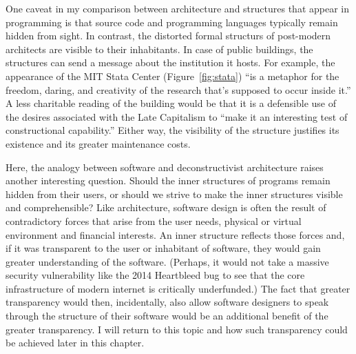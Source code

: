 One caveat in my comparison between architecture and structures that appear in programming is
that source code and programming languages typically remain hidden from sight. In contrast, the
distorted formal structurs of post-modern architects are visible to their inhabitants. In case of
public buildings, the structures can send a message about the institution it hosts. For example,
the appearance of the MIT Stata Center (Figure~\ref{fig:stata}) ``is a metaphor for the freedom,
daring, and creativity of the research that's supposed to occur inside it.''
A less charitable reading of the building would be that it is a defensible use of the
desires associated with the Late Capitalism to ``make it an interesting test of constructional
capability.'' Either way, the
visibility of the structure justifies its existence and its greater maintenance costs.

Here, the analogy between software and deconstructivist architecture raises another interesting
question. Should the inner structures of programs remain hidden from their users, or should
we strive to make the inner structures visible and comprehensible?
Like architecture, software design is often the result of contradictory forces that
arise from the user needs, physical or virtual environment and financial interests.
An inner structure reflects those forces and, if it was transparent to the user or inhabitant
of software, they would gain greater understanding of the software. (Perhaps, it would not
take a massive security vulnerability like the 2014 Heartbleed bug to see that the core
infrastructure of modern internet is critically underfunded.)
The fact that greater transparency would then, incidentally, also allow software designers to
speak through the structure of their software would be an additional benefit of the greater
transparency. I will return to this topic and how such transparency could be achieved
later in this chapter.

